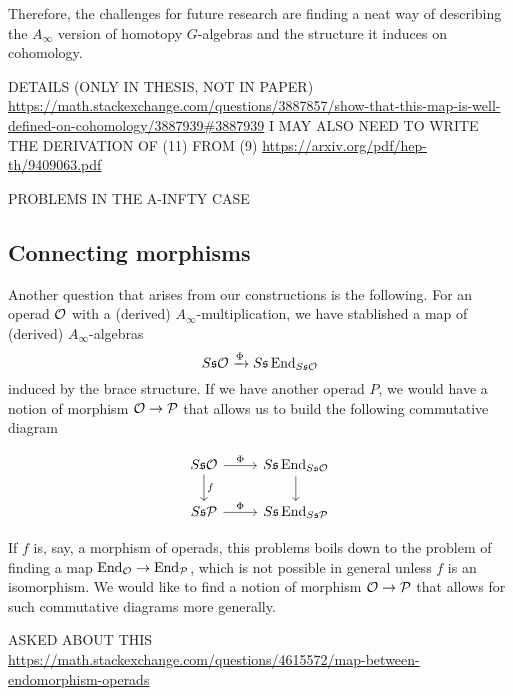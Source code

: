 \documentclass[join.tex]{subfiles}
\begin{document}
Therefore, the challenges for future research are finding a neat way of describing the $A_\infty$ version of homotopy $G$-algebras and the structure it induces on cohomology.


DETAILS (ONLY IN THESIS, NOT IN PAPER)
\url{https://math.stackexchange.com/questions/3887857/show-that-this-map-is-well-defined-on-cohomology/3887939#3887939}%
I MAY ALSO NEED TO WRITE THE DERIVATION OF (11) FROM (9)
\url{https://arxiv.org/pdf/hep-th/9409063.pdf}

PROBLEMS IN THE A-INFTY CASE
\subsection{Connecting morphisms}


Another question that arises from our constructions is the following. For an operad ${\mathcal O}$ with a (derived) $A_\infty$-multiplication, we have stablished a map of (derived) $A_\infty$-algebras
\[S\mathfrak{s}{\mathcal O}\xrightarrow{\Phi}S\mathfrak{s}\operatorname{End}_{S\mathfrak{s}{\mathcal O}}\]
induced by the brace structure. If we have another operad $P$, we would have a notion of morphism ${\mathcal O}\to\mathcal{P}$ that allows us to build the following commutative diagram

\[
\begin{tikzcd}
S\s\OO\arrow[r, "\Phi"]\arrow[d, "f"] & S\s\End_{S\s\OO}\arrow[d]\\
S\s\PP\arrow[r, "\Phi"] & S\s\End_{S\s\PP}
\end{tikzcd}
\]

If $f$ is, say, a morphism of operads, this problems boils down to the problem of finding a map $\operatorname{End}_{\mathcal O}\to\operatorname{End}_{\mathcal{P}}$, which is not possible in general unless $f$ is an isomorphism. We would like to find a notion of morphism ${\mathcal O}\to\mathcal{P}$ that allows for such commutative diagrams more generally. 

ASKED ABOUT THIS \url{https://math.stackexchange.com/questions/4615572/map-between-endomorphism-operads}
\end{document}
